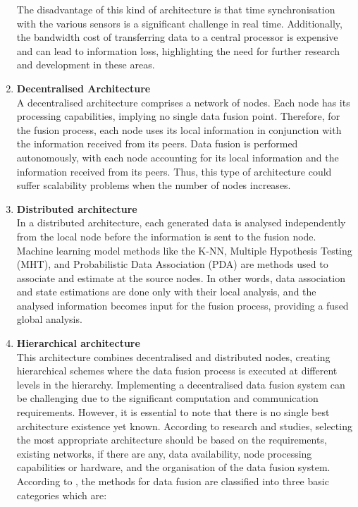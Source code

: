 \begin{enumerate}
The disadvantage of this kind of architecture is that time synchronisation with the various sensors is a significant challenge in real time. Additionally, the bandwidth cost of transferring data to a central processor is expensive and can lead to information loss, highlighting the need for further research and development in these areas.
\item\textbf{Decentralised Architecture} \\A decentralised architecture comprises a network of nodes. Each node has its processing capabilities, implying no single data fusion point. Therefore, for the fusion process, each node uses its local information in conjunction with the information received from its peers. Data fusion is performed autonomously, with each node accounting for its local information and the information received from its peers. Thus, this type of architecture could suffer scalability problems when the number of nodes increases. 
\item\textbf{Distributed architecture} \\In a distributed architecture, each generated data is analysed independently from the local node before the information is sent to the fusion node. Machine learning model methods like the K-NN, Multiple Hypothesis Testing (MHT), and Probabilistic Data Association (PDA) are methods used to associate and estimate at the source nodes. In other words, data association and state estimations are done only with their local analysis, and the analysed information becomes input for the fusion process, providing a fused global analysis.
\item\textbf{Hierarchical architecture}
\\This architecture combines decentralised and distributed nodes, creating hierarchical schemes where the data fusion process is executed at different levels in the hierarchy. Implementing a decentralised data fusion system can be challenging due to the significant computation and communication requirements. However, it is essential to note that there is no single best architecture existence yet known.  
According to research and studies, selecting the most appropriate architecture should be based on the requirements, existing networks, if there are any, data availability, node processing capabilities or hardware, and the organisation of the data fusion system.  
According to \cite{castanedo2013}, the methods for data fusion are classified into three basic categories which are:
\begin{itemize}  %

\end{itemize}
\end{enumerate}
